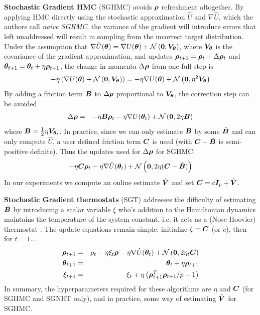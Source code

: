 \documentclass[]{article}
\begin{document}
{\bf Stochastic Gradient HMC} (SGHMC) \cite{chen2014stochastic} avoids ${\bm \rho}$ refreshment altogether.  By applying HMC directly using the stochastic approximation $\hat{U}$ and $\nabla \hat{U}$, which the authors call {\em naive SGHMC}, the variance of the gradient will introduce errors that left unaddressed will result in sampling from the incorrect target distribution.  Under the assumption that $\nabla \hat{U}({\bm \theta}) = \nabla U({\bm \theta}) + \mathcal{N}\left( {\bm 0}, {\bm V}_{{\bm \theta}}\right)$, where ${\bm V}_{{\bm \theta}}$ is the covariance of the gradient approximation, and  updates ${\bm \rho}_{t+1} = {\bm \rho}_{t} + \Delta {\bm \rho}_{t}$ and ${\bm \theta}_{t+1} = {\bm \theta}_t + \eta {\bm \rho}_{t+1}$, the change in momenta $\Delta {\bm \rho}$ from one full step is
 \begin{equation}
   - \eta \left( \nabla U({\bm \theta}) + \mathcal{N}\left( {\bm 0}, {\bm V}_{{\bm \theta}}\right)\right)  =  - \eta \nabla U({\bm \theta}) + \mathcal{N}\left( {\bm 0}, \eta^2 {\bm V}_{{\bm \theta}}\right)  
 \end{equation}
By adding a friction term ${\bm B}$ to $\Delta {\bm \rho}$ proportional to ${\bm V}_{{\bm \theta}}$, the correction step can be avoided
 \begin{eqnarray}
   \Delta {\bm \rho} & = & - \eta {\bm B} {\bm \rho}_t - \eta \nabla U({\bm \theta}_t) + \mathcal{N}\left( {\bm 0}, 2 \eta {\bm B}\right) 
 \end{eqnarray}
 where  ${\bm B}=\frac{1}{2}\eta {\bm V}_{{\bm \theta}_t}$.   In practice, since we can only estimate ${\bm B}$ by some $\hat{{\bm B}}$ and can only compute $\hat{U}$, a user defined friction term ${\bm C}$ is used (with ${\bm C} - \hat{{\bm B}}$ is semi-positive definite).  Thus the updates used for $\Delta {\bm \rho}$ for SGHMC:
 \begin{equation}
   - \eta {\bm C} {\bm \rho}_t - \eta \nabla \hat{U}({\bm \theta}_t) + \mathcal{N}\left( {\bm 0}, 2 \eta ({\bm C}-\hat{{\bm B}}) \right) 
 \end{equation}
 In our experiments we compute an online estimate $\hat{{\bm V}}$ and set ${\bm C} = c {\bm I}_p + \hat{{\bm V}}$.  
 
 {\bf Stochastic Gradient thermostats} (SGT) \cite{ding2014bayesian} addresses the difficulty of estimating $\hat{{\bm B}}$ by introducing a scalar variable $\xi$ who's addition to the Hamiltonian dynamics maintains the temperature of the system constant, i.e. it acts as a (Nose-Hoovier) thermostat \cite{leimkuhler:2009}.  The update equations remain simple: initialize $\xi = {\bm C}$ (or $c$), then for $t=1\ldots$
 \begin{eqnarray}
   {\bm \rho}_{t+1} & = & \rho_t - \eta \xi_t {\bm \rho} - \eta \nabla \hat{U}({\bm \theta}_t) + \mathcal{N}\left( {\bm 0}, 2 \eta_t {\bm C} \right) \\
   {\bm \theta}_{t+1} & = & {\bm \theta}_t + \eta {\bm \rho}_{t+1} \\
   \xi_{t+1} & = & \xi_t + \eta \left(  {\bm \rho}_{t+1}^T {\bm \rho}_{t+1} / p - 1 \right)
 \end{eqnarray}
 In summary, the hyperparameters required for these algorithms are $\eta$ and ${\bm C}$ (for SGHMC and SGNHT only), and in practice, some way of estimating $\hat{{\bm V}}$ for SGHMC.  
  
\end{document}
